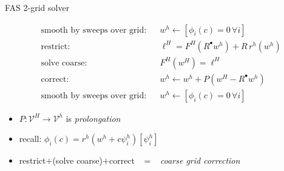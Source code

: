 \documentclass[svgnames,
               hyperref={colorlinks,citecolor=DeepPink4,linkcolor=FireBrick,urlcolor=Maroon},
               usepdftitle=false]  %
               {beamer}
\newcommand{\iR}{R^{\bullet}}
\begin{document}
\begin{frame}{FAS 2-grid solver}

\begin{align*}
&\text{smooth by sweeps over grid:} & &w^h \leftarrow \left[\phi_i(c) = 0 \,\forall i\right] \\
&\text{restrict:}                   & &\ell^H = F^H(\iR w^h) + R\, r^h(w^h) \\
&\text{solve coarse:}                      & &F^H(w^H) = \ell^H \\
&\text{correct}:                    & &w^h \leftarrow w^h + P(w^H - \iR w^h) \\
&\text{smooth by sweeps over grid:} & &w^h \leftarrow \left[\phi_i(c) = 0 \,\forall i\right]
\end{align*}

\bigskip
{\small
\begin{itemize}
\item $P: \mathcal{V}^H \to \mathcal{V}^h$ is \emph{prolongation}
\item recall: \quad $\phi_i(c) = r^h(w^h + c \psi_i^h)[\psi_i^h]$
\item restrict$+$(solve coarse)$+$correct \, $=$ \, \emph{coarse grid correction}
\end{itemize}
}
\end{frame}
\end{document}

